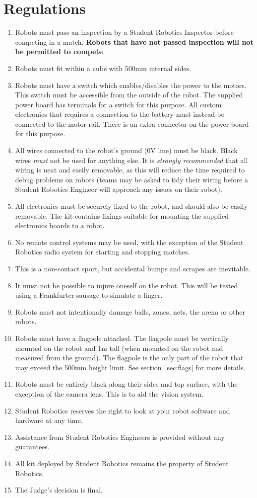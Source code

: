 \section {Regulations}
\label{regs}

\begin{enumerate}
\item Robots must pass an inspection by a Student Robotics Inspector before competing in a match.  \textbf{Robots that have not passed inspection will not be permitted to compete}.
\item Robots must fit within a cube with 500mm internal sides.
\item Robots must have a switch which enables/disables the power to the motors.  This switch must be accessible from the outside of the robot.  The supplied power board has terminals for a switch for this purpose.  All custom electronics that requires a connection to the battery must instead be connected to the motor rail.  There is an extra connector on the power board for this purpose.
\item All wires connected to the robot's ground (0V line) must be black.  Black wires \emph{must} not be used for anything else.  It is \emph{strongly recommended} that all wiring is neat and easily removable, as this will reduce the time required to debug problems on robots (teams may be asked to tidy their wiring before a Student Robotics Engineer will approach any issues on their robot).
\item All electronics must be securely fixed to the robot, and should also be easily removable.  The kit contains fixings suitable for mounting the supplied electronics boards to a robot.
\item No remote control systems may be used, with the exception of the Student Robotics radio system for starting and stopping matches.
\item This is a non-contact sport, but accidental bumps and scrapes are inevitable.
\item It must not be possible to injure oneself on the robot.  This will be tested using a Frankfurter sausage to simulate a finger.
\item Robots must not intentionally damage balls, zones, nets, the arena or other robots.
\item Robots must have a flagpole attached.  The flagpole must be vertically mounted on the robot and 1m tall (when mounted on the robot and measured from the ground).  The flagpole is the only part of the robot that may exceed the 500mm height limit.  See section~\ref{sec:flags} for more details.
\item Robots must be entirely black along their sides and top surface, with the exception of the camera lens.  This is to aid the vision system.
\item Student Robotics reserves the right to look at your robot software and hardware at any time.
\item Assistance from Student Robotics Engineers is provided without any guarantees.
\item All kit deployed by Student Robotics remains the property of Student Robotics.
\item The Judge's decision is final.


\end{enumerate}
